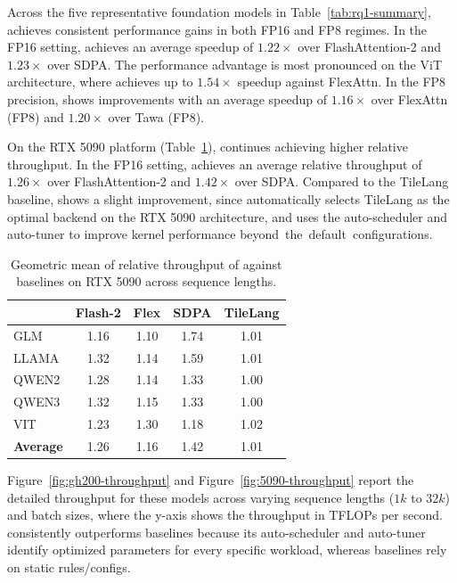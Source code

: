 Across the five representative foundation models in Table~\ref{tab:rq1-summary}, \NAME{}
achieves consistent performance gains in both FP16 and FP8 regimes.
In the FP16 setting, \NAME{} achieves an average speedup of $1.22\times$ over
FlashAttention-2 and $1.23\times$ over SDPA.
The performance advantage is most pronounced on the ViT architecture, where \NAME{}
achieves up to $1.54\times$ speedup against FlexAttn.
In the FP8 precision, \NAME{} shows improvements with an average speedup of $1.16\times$
over FlexAttn (FP8) and $1.20\times$ over Tawa (FP8).

On the RTX 5090 platform (Table~\ref{tab:rq1-summary-5090}), \NAME{} continues achieving
higher relative throughput.
In the FP16 setting, \NAME{} achieves an average relative throughput of $1.26\times$ over
FlashAttention-2 and $1.42\times$ over SDPA.
Compared to the TileLang baseline, \NAME{} shows a slight improvement, since \NAME{}
automatically selects TileLang as the optimal backend on the RTX 5090 architecture, and
uses the auto-scheduler and auto-tuner to improve kernel performance \mbox{beyond the
default configurations.}

\begin{table}[t!]
  \centering
  \small
  \setlength{\tabcolsep}{6.5pt}
  \caption{Geometric mean of relative throughput of \NAME{} against baselines on RTX 5090
  across sequence lengths.}
  \label{tab:rq1-summary-5090}
  \def\dgbox{\diagbox[width=6em, height=2.5em]{Model}{Method}}
  \renewcommand{\arraystretch}{0.93}
\begin{tabular}{l|cccc}
  \toprule
  \dgbox & Flash-2 & Flex & SDPA & TileLang \\
  \midrule
  GLM     & 1.16 & 1.10 & 1.74 & 1.01 \\
  LLAMA   & 1.32 & 1.14 & 1.59 & 1.01 \\
  QWEN2   & 1.28 & 1.14 & 1.33 & 1.00 \\
  QWEN3   & 1.32 & 1.15 & 1.33 & 1.00 \\
  VIT     & 1.23 & 1.30 & 1.18 & 1.02 \\
  \midrule
  \textbf{Average} & 1.26 & 1.16 & 1.42 & 1.01 \\
  \bottomrule
\end{tabular}
\end{table}

Figure~\ref{fig:gh200-throughput} and Figure~\ref{fig:5090-throughput} report the
detailed throughput for these models across varying sequence lengths
($1k$ to $32k$) and batch sizes, where the y-axis shows the throughput in TFLOPs per second.
\NAME{} consistently outperforms baselines because its auto-scheduler and auto-tuner
identify optimized parameters for every specific workload, whereas baselines rely on
static rules/configs.

